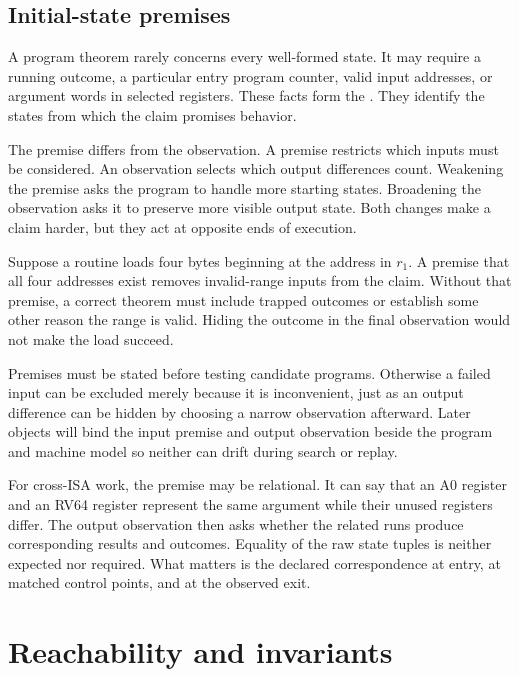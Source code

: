 \subsection{Initial-state premises}

A program theorem rarely concerns every well-formed state. It may require a
running outcome, a particular entry program counter, valid input addresses,
or argument words in selected registers. These facts form the
. They identify the states from which the claim
promises behavior.

The premise differs from the observation. A premise restricts which inputs
must be considered. An observation selects which output differences count.
Weakening the premise asks the program to handle more starting states.
Broadening the observation asks it to preserve more visible output state.
Both changes make a claim harder, but they act at opposite ends of execution.

\begin{example}[title={One address premise prevents an expected trap}]
Suppose a routine loads four bytes beginning at the address in \(r_1\). A
premise that all four addresses exist removes invalid-range inputs from the
claim. Without that premise, a correct theorem must include trapped outcomes
or establish some other reason the range is valid. Hiding the outcome in the
final observation would not make the load succeed.
\end{example}

Premises must be stated before testing candidate programs. Otherwise a failed
input can be excluded merely because it is inconvenient, just as an output
difference can be hidden by choosing a narrow observation afterward. Later
objects will bind the input premise and output observation beside the program
and machine model so neither can drift during search or replay.

For cross-ISA work, the premise may be relational. It can say that an A0
register and an RV64 register represent the same argument while their unused
registers differ. The output observation then asks whether the related runs
produce corresponding results and outcomes. Equality of the raw state tuples
is neither expected nor required.
What matters is the declared correspondence at entry, at matched control
points, and at the observed exit.

\section{Reachability and invariants}

